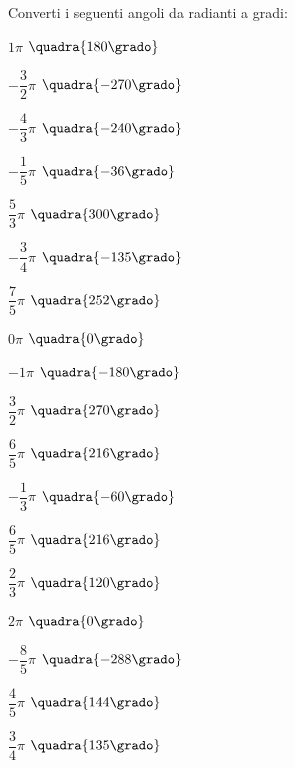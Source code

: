 \begin{esercizio}\label{ese:gonio.2}
 Converti i seguenti angoli da radianti a gradi:
\begin{multicols}{3}
 \begin{enumeratea}
  \item  $1 \pi$
   \hfill $\quadra{180 \grado}$
  \item  $-\dfrac{3}{2} \pi$
   \hfill $\quadra{-270 \grado}$
  \item  $-\dfrac{4}{3} \pi$
   \hfill $\quadra{-240 \grado}$
  \item  $-\dfrac{1}{5} \pi$
   \hfill $\quadra{-36 \grado}$
  \item  $\dfrac{5}{3} \pi$
   \hfill $\quadra{300 \grado}$
  \item  $-\dfrac{3}{4} \pi$
   \hfill $\quadra{-135 \grado}$
  \item  $\dfrac{7}{5} \pi$
   \hfill $\quadra{252 \grado}$
  \item  $0 \pi$
   \hfill $\quadra{0 \grado}$
  \item  $-1 \pi$
   \hfill $\quadra{-180 \grado}$
  \item  $\dfrac{3}{2} \pi$
   \hfill $\quadra{270 \grado}$
  \item  $\dfrac{6}{5} \pi$
   \hfill $\quadra{216 \grado}$
  \item  $-\dfrac{1}{3} \pi$
   \hfill $\quadra{-60 \grado}$
  \item  $\dfrac{6}{5} \pi$
   \hfill $\quadra{216 \grado}$
  \item  $\dfrac{2}{3} \pi$
   \hfill $\quadra{120 \grado}$
  \item  $2 \pi$
   \hfill $\quadra{0 \grado}$
  \item  $-\dfrac{8}{5} \pi$
   \hfill $\quadra{-288 \grado}$
  \item  $\dfrac{4}{5} \pi$
   \hfill $\quadra{144 \grado}$
  \item  $\dfrac{3}{4} \pi$
   \hfill $\quadra{135 \grado}$
 \end{enumeratea}
\end{multicols}
\end{esercizio}

